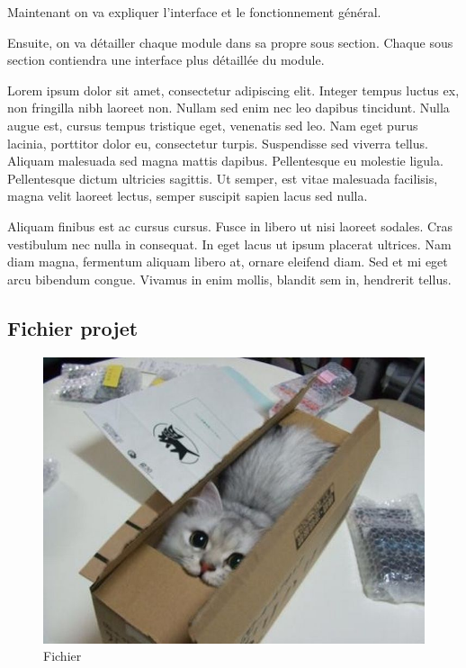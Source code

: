 		Maintenant on va expliquer l'interface et le fonctionnement général.

		Ensuite, on va détailler chaque module dans sa propre sous section. Chaque sous section contiendra une interface plus détaillée du module.

		Lorem ipsum dolor sit amet, consectetur adipiscing elit. Integer tempus luctus ex, non fringilla nibh laoreet non. Nullam sed enim nec leo dapibus tincidunt. Nulla augue est, cursus tempus tristique eget, venenatis sed leo. Nam eget purus lacinia, porttitor dolor eu, consectetur turpis. Suspendisse sed viverra tellus. Aliquam malesuada sed magna mattis dapibus. Pellentesque eu molestie ligula. Pellentesque dictum ultricies sagittis. Ut semper, est vitae malesuada facilisis, magna velit laoreet lectus, semper suscipit sapien lacus sed nulla.

		Aliquam finibus est ac cursus cursus. Fusce in libero ut nisi laoreet sodales. Cras vestibulum nec nulla in consequat. In eget lacus ut ipsum placerat ultrices. Nam diam magna, fermentum aliquam libero at, ornare eleifend diam. Sed et mi eget arcu bibendum congue. Vivamus in enim mollis, blandit sem in, hendrerit tellus.


	\subsection{Fichier projet}
		\begin{figure}
			\begin{center}
				\includegraphics[width=1\textwidth]{figure/fichier.jpg}
			\end{center}
			\caption{Fichier}
			\label{fig:fichier}
		\end{figure}

